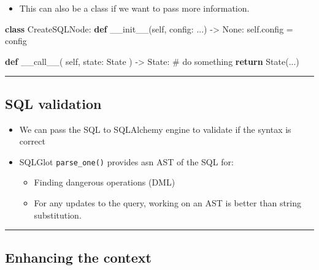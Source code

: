 \documentclass[
  letterpaper,
  DIV=11,
  numbers=noendperiod]{scrartcl}
\newenvironment{Shaded}{\begin{snugshade}}{\end{snugshade}}
\newcommand{\CommentTok}[1]{\textcolor[rgb]{0.37,0.37,0.37}{#1}}
\newcommand{\ControlFlowTok}[1]{\textcolor[rgb]{0.00,0.23,0.31}{\textbf{#1}}}
\newcommand{\FunctionTok}[1]{\textcolor[rgb]{0.28,0.35,0.67}{#1}}
\newcommand{\KeywordTok}[1]{\textcolor[rgb]{0.00,0.23,0.31}{\textbf{#1}}}
\newcommand{\NormalTok}[1]{\textcolor[rgb]{0.00,0.23,0.31}{#1}}
\newcommand{\OperatorTok}[1]{\textcolor[rgb]{0.37,0.37,0.37}{#1}}
\newcommand{\VariableTok}[1]{\textcolor[rgb]{0.07,0.07,0.07}{#1}}
\providecommand{\tightlist}{%
  \setlength{\itemsep}{0pt}\setlength{\parskip}{0pt}}
\begin{document}
\begin{itemize}
\tightlist
\item
  This can also be a class if we want to pass more information.
\end{itemize}

\begin{Shaded}
\begin{Highlighting}[]
\KeywordTok{class}\NormalTok{ CreateSQLNode:}
  \KeywordTok{def} \FunctionTok{\_\_init\_\_}\NormalTok{(}\VariableTok{self}\NormalTok{, config: ...) }\OperatorTok{{-}\textgreater{}} \VariableTok{None}\NormalTok{:}
    \VariableTok{self}\NormalTok{.config }\OperatorTok{=}\NormalTok{ config}
  
  \KeywordTok{def} \FunctionTok{\_\_call\_\_}\NormalTok{(}
    \VariableTok{self}\NormalTok{, state: State}
\NormalTok{  ) }\OperatorTok{{-}\textgreater{}}\NormalTok{ State:}
    \CommentTok{\# do something}
    \ControlFlowTok{return}\NormalTok{ State(...)}
\end{Highlighting}
\end{Shaded}

\begin{center}\rule{0.5\linewidth}{0.5pt}\end{center}

\subsection{SQL validation}\label{sql-validation}

\begin{itemize}
\tightlist
\item
  We can pass the SQL to SQLAlchemy engine to validate if the syntax is
  correct
\item
  SQLGlot \texttt{parse\_one()} provides asn AST of the SQL for:

  \begin{itemize}
  \tightlist
  \item
    Finding dangerous operations (DML)
  \item
    For any updates to the query, working on an AST is better than
    string substitution.
  \end{itemize}
\end{itemize}

\begin{center}\rule{0.5\linewidth}{0.5pt}\end{center}

\subsection{Enhancing the context}\label{enhancing-the-context}
\end{document}
